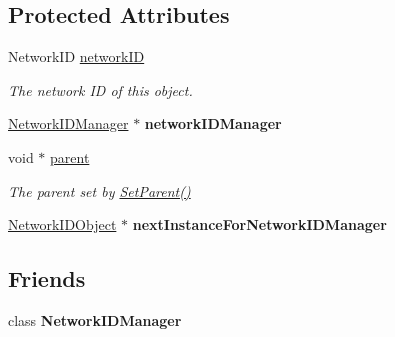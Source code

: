\subsection*{Protected Attributes}
\begin{DoxyCompactItemize}
\item 
\hypertarget{class_rak_net_1_1_network_i_d_object_aa88968a38decf8659bc5e55e8193818b}{Network\-I\-D \hyperlink{class_rak_net_1_1_network_i_d_object_aa88968a38decf8659bc5e55e8193818b}{network\-I\-D}}\label{class_rak_net_1_1_network_i_d_object_aa88968a38decf8659bc5e55e8193818b}

\begin{DoxyCompactList}\small\item\em The network I\-D of this object. \end{DoxyCompactList}\item 
\hypertarget{class_rak_net_1_1_network_i_d_object_a9deff1896e1bc8b3fa5cb3dfb3b441af}{\hyperlink{class_rak_net_1_1_network_i_d_manager}{Network\-I\-D\-Manager} $\ast$ {\bfseries network\-I\-D\-Manager}}\label{class_rak_net_1_1_network_i_d_object_a9deff1896e1bc8b3fa5cb3dfb3b441af}

\item 
\hypertarget{class_rak_net_1_1_network_i_d_object_a0df64530ef4626519c4e9999ad753a77}{void $\ast$ \hyperlink{class_rak_net_1_1_network_i_d_object_a0df64530ef4626519c4e9999ad753a77}{parent}}\label{class_rak_net_1_1_network_i_d_object_a0df64530ef4626519c4e9999ad753a77}

\begin{DoxyCompactList}\small\item\em The parent set by \hyperlink{class_rak_net_1_1_network_i_d_object_a4cc5a498e4cd73194d7406350dd7a4c6}{Set\-Parent()} \end{DoxyCompactList}\item 
\hypertarget{class_rak_net_1_1_network_i_d_object_a432357e461fae499cef98ceec470a38e}{\hyperlink{class_rak_net_1_1_network_i_d_object}{Network\-I\-D\-Object} $\ast$ {\bfseries next\-Instance\-For\-Network\-I\-D\-Manager}}\label{class_rak_net_1_1_network_i_d_object_a432357e461fae499cef98ceec470a38e}

\end{DoxyCompactItemize}
\subsection*{Friends}
\begin{DoxyCompactItemize}
\item 
\hypertarget{class_rak_net_1_1_network_i_d_object_a2f909b82ae78a67063d99a148bd64f5c}{class {\bfseries Network\-I\-D\-Manager}}\label{class_rak_net_1_1_network_i_d_object_a2f909b82ae78a67063d99a148bd64f5c}

\end{DoxyCompactItemize}


